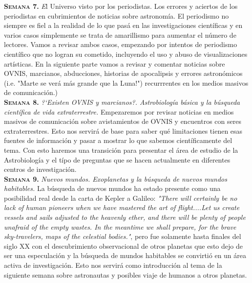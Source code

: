 \documentclass[letterpaper,10pt,onecolumn]{article}
\begin{document}
\noindent\textbf{\textsc{Semana 7.}} {\textit El Universo visto por los
periodistas. Los errores y aciertos de los periodistas en
cubrimientos de noticias sobre astronom\'ia.} El periodismo
no siempre es fiel a la realidad de lo que pas\'a en las
investigaciones cient\'ificas y en varios casos simplemente se trata
de amarillismo para aumentar el n\'umero de lectores. Vamos a revisar
ambos casos, empezando por intentos de periodismo cient\'ifico que no
logran su cometido, incluyendo el uso y abuso de visualizaciones
art\'isticas. En la siguiente parte vamos a revisar y comentar noticias sobre
OVNIS, marcianos, abducciones, historias de apocalipsis y errores
astron\'omicos (i.e. "Marte se ver\'a m\'as grande que la
Luna!") recurrrentes en los medios masivos de comunicaci\'on.)\\[-0.3cm]    

\noindent\textbf{\textsc{Semana 8.}} \textit{?`Existen OVNIS y
marcianos?. Astrobiolog\'ia b\'asica y la b\'usqueda cient\'ifica de
vida  extraterrestre.} Empezaremos por revisar noticias en medios
masivos de comunicaci\'on sobre avistamientos de OVNIS y encuentros
con seres extraterrestres. Esto nos servir\'a de base para saber qu\'e
limitaciones tienen esas fuentes de informaci\'on y pasar a
mostrar lo que sabemos cient\'ificamente del tema. Con esto haremos
una transici\'on para presentar el \'area de estudio de la
Astrobiolog\'ia y el t\'ipo de preguntas que se hacen actualmente en
diferentes centros de investigaci\'on. \\[-0.3cm]   

\noindent\textbf{\textsc{Semana 9.}} \textit{Nuevos mundos. Exoplanetas y la
b\'usqueda de nuevos mundos habitables.} La b\'usqueda de nuevos
mundos ha estado presente como una posibilidad real desde la carta de
Kepler a Galileo: \textit{"There will certainly be no lack of human
  pioneers when we   have mastered the art of flight....Let us create
  vessels and sails   adjusted to the heavenly ether, and there will
  be plenty of people   unafraid of the empty wastes. In the meantime we shall prepare, for
  the brave sky-travelers, maps of the celestial
  bodies."}, pero fue solamente hasta finales del siglo XX con el
descubrimiento observacional de otros planetas que esto dejo de ser
una especulaci\'on y la b\'usqueda de mundos habitables se convirti\'o
en un \'area activa de investigaci\'on. Esto nos servir\'a como
introducci\'on al tema de la siguiente semana sobre astronautas y
posibles viaje de humanos a otros planetas.\\[-0.3cm]    
 
\end{document}
